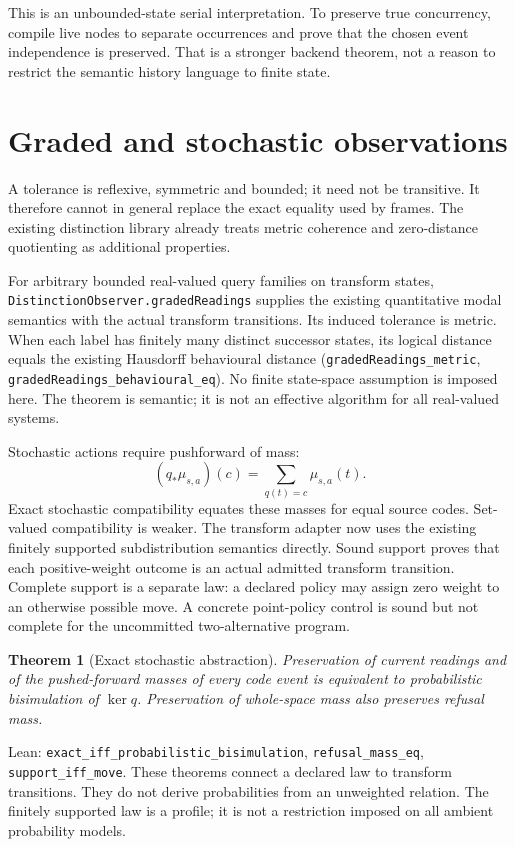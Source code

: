 \documentclass[11pt]{article}
\newtheorem{theorem}{Theorem}
\newcommand{\lean}[1]{\nolinkurl{#1}}
\begin{document}
This is an unbounded-state serial interpretation. To preserve true
concurrency, compile live nodes to separate occurrences and prove that the
chosen event independence is preserved. That is a stronger backend theorem,
not a reason to restrict the semantic history language to finite state.

\section{Graded and stochastic observations}
A tolerance is reflexive, symmetric and bounded; it need not be transitive.
It therefore cannot in general replace the exact equality used by frames.
The existing distinction library already treats metric coherence and
zero-distance quotienting as additional properties.

For arbitrary bounded real-valued query families on transform states,
\lean{DistinctionObserver.gradedReadings} supplies the existing quantitative
modal semantics with the actual transform transitions. Its induced tolerance
is metric. When each label has finitely many distinct successor states,
its logical distance equals the existing Hausdorff behavioural distance
(\lean{gradedReadings_metric}, \lean{gradedReadings_behavioural_eq}). No finite
state-space assumption is imposed here. The theorem is semantic; it is not
an effective algorithm for all real-valued systems.

Stochastic actions require pushforward of mass:
\[
  (q_*\mu_{s,a})(c)=\sum_{q(t)=c}\mu_{s,a}(t).
\]
Exact stochastic compatibility equates these masses for equal source codes.
Set-valued compatibility is weaker. The transform adapter now uses the
existing finitely supported subdistribution semantics directly. Sound
support proves that each positive-weight outcome is an actual admitted
transform transition. Complete support is a separate law: a declared policy
may assign zero weight to an otherwise possible move. A concrete point-policy
control is sound but not complete for the uncommitted two-alternative program.

\begin{theorem}[Exact stochastic abstraction]
Preservation of current readings and of the pushed-forward masses of every
code event is equivalent to probabilistic bisimulation of $\ker q$.
Preservation of whole-space mass also preserves refusal mass.
\end{theorem}
\noindent Lean: \lean{exact_iff_probabilistic_bisimulation},
\lean{refusal_mass_eq}, \lean{support_iff_move}. These theorems connect a
declared law to transform transitions. They do not derive probabilities from
an unweighted relation. The finitely supported law is a profile; it is not a
restriction imposed on all ambient probability models.
\end{document}
